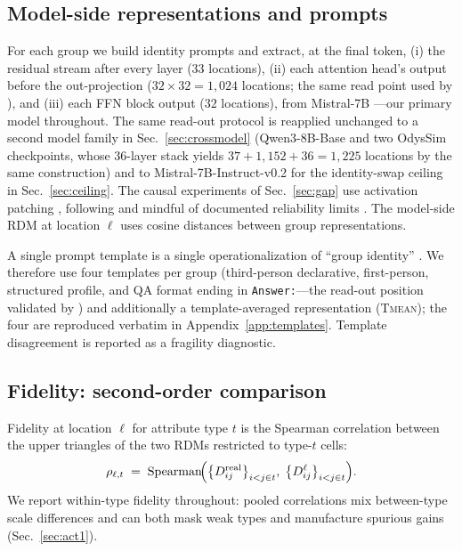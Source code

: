 \subsection{Model-side representations and prompts}
For each group we build identity prompts and extract, at the final token,
(i) the residual stream after every layer ($33$ locations), (ii) each
attention head's output before the out-projection
($32\times32=1{,}024$ locations; the same read point used by
\citealp{llmopinions2026}), and (iii) each FFN block output ($32$
locations), from Mistral-7B \citep{mistral7b}---our primary model
throughout. The same read-out protocol is reapplied unchanged to a second
model family in Sec.~\ref{sec:crossmodel} (Qwen3-8B-Base and two OdysSim
checkpoints, whose 36-layer stack yields $37+1{,}152+36=1{,}225$
locations by the same construction) and to Mistral-7B-Instruct-v0.2 for
the identity-swap ceiling in Sec.~\ref{sec:ceiling}. The causal
experiments of Sec.~\ref{sec:gap} use activation patching
\citep{meng2022rome, wang2023ioi}, following \citet{heimersheim2024} and
mindful of documented reliability limits \citep{causalprobing2025}. The
model-side RDM at location $\ell$ uses cosine distances between group
representations.

A single prompt template is a single operationalization of ``group
identity'' \citep{constructvalidity2026}. We therefore use four templates
per group (third-person declarative, first-person, structured profile,
and QA format ending in \texttt{Answer:}---the read-out position validated
by \citealp{llmopinions2026}) and additionally a template-averaged
representation (\textsc{Tmean}); the four are reproduced verbatim in
Appendix~\ref{app:templates}. Template disagreement is reported as a
fragility diagnostic.

\subsection{Fidelity: second-order comparison}
Fidelity at location $\ell$ for attribute type $t$ is the Spearman
correlation between the upper triangles of the two RDMs restricted to
type-$t$ cells:
\begin{equation}
\rho_{\ell,t} \;=\; \mathrm{Spearman}\!\Big(
\big\{D^{\mathrm{real}}_{ij}\big\}_{i<j\in t},\;
\big\{D^{\ell}_{ij}\big\}_{i<j\in t}\Big).
\end{equation}
We report within-type fidelity throughout: pooled correlations mix
between-type scale differences and can both mask weak types and
manufacture spurious gains (Sec.~\ref{sec:act1}).

